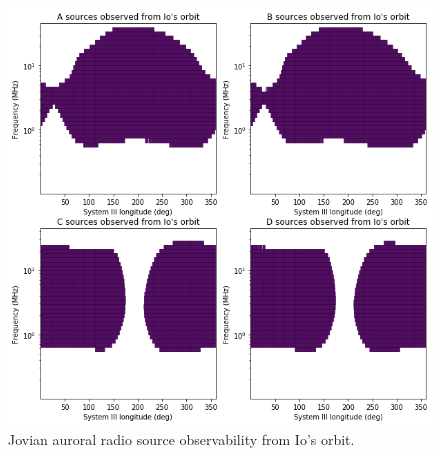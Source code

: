 \documentclass[referee]{aa}
\begin{document}
\begin{figure}
    \centering
    \includegraphics[width=\textwidth]{esz-io.png}
    \caption{Jovian auroral radio source observability from Io's orbit.}
    \label{fig:esz-io}
\end{figure}



\end{document}
